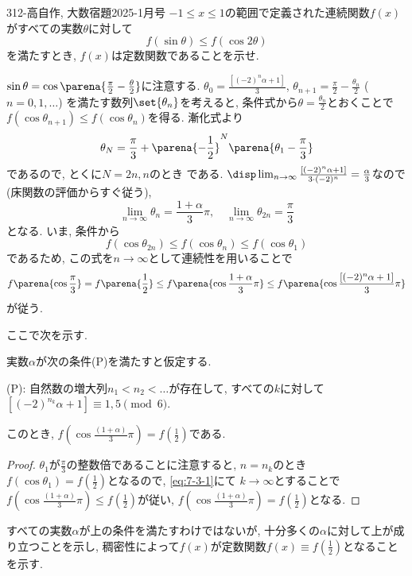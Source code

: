 \begin{prob}{312}{-高}{自作, 大数宿題2025-1月号}
$-1\leq x\leq 1$の範囲で定義された連続関数$f(x)$がすべての実数$\theta$に対して
\[ f(\sin{\theta}) \leq f(\cos{2\theta}) \]
を満たすとき, $f(x)$は定数関数であることを示せ. 
\end{prob}


 $\sin{\theta} = \cos{\parena{\frac{\pi}{2} - \frac{\theta}{2}}}$に注意する. $\theta_{0}=\frac{[(-2)^n \alpha +1]}{3}$, 
 $\theta_{n+1}=\frac{\pi}{2} - \frac{\theta_{n}}{2}$ ($n=0,1,\dots$) を満たす数列$\set{\theta_{n}}$を考えると, 条件式から$\theta = \frac{\theta_n}{2}$とおくことで $f(\cos{\theta_{n+1}})\leq f(\cos{\theta_{n}})$を得る. 
漸化式より
 \[\theta_{N} = \frac{\pi}{3} + \parena{-\frac{1}{2}}^{N}\parena{\theta_1 - \frac{\pi}{3}}\]
 であるので, とくに$N=2n,n$のとき
である. $\disp\lim_{n\to \infty} \frac{[(-2)^n\alpha + 1]}{3\cdot (-2)^n} = \frac{\alpha}{3}$なので(床関数の評価からすぐ従う), 
\[
\lim_{n\to \infty} \theta_n = \frac{1+\alpha}{3}\pi ,\quad \lim_{n\to\infty} \theta_{2n} = \frac{\pi}{3}
\]
となる. いま, 条件から
\begin{equation} \label{eq:7-3-1}
f(\cos{\theta_{2n}}) \leq f(\cos{\theta_n}) \leq f(\cos{\theta_1})
\end{equation}
であるため, この式を$n\to \infty$として連続性を用いることで
\[
f\parena{\cos{\frac{\pi}{3}}} = f\parena{\frac{1}{2}} \leq f\parena{\cos{\frac{1+\alpha}{3}\pi }} \leq f\parena{\cos{\frac{[(-2)^n\alpha + 1]}{3}\pi}}
\]
が従う. 


ここで次を示す. 
\begin{lem}\label{on_(P)_constant}
実数$\alpha$が次の条件(P)を満たすと仮定する. 
\begin{center}
(P): 自然数の増大列$n_1 < n_2 < \dots$が存在して, すべての$k$に対して $[(-2)^{n_k}\alpha + 1]\equiv 1,5\pmod{6}$.
\end{center}
このとき, $f(\cos{\frac{(1+\alpha)}{3}\pi}) = f(\frac{1}{2})$である. 
\end{lem}
\begin{proof}
$\theta_1$が$\frac{\pi}{3}$の整数倍であることに注意すると, $n=n_k$のとき $f(\cos{\theta_1}) = f(\frac{1}{2})$となるので, \cref{eq:7-3-1}にて $k\to \infty$とすることで$f(\cos{\frac{(1+\alpha)}{3}\pi}) \leq f(\frac{1}{2})$が従い, $f(\cos{\frac{(1+\alpha)}{3}\pi}) = f(\frac{1}{2})$となる.     
\end{proof}
すべての実数$\alpha$が上の条件を満たすわけではないが, 十分多くの$\alpha$に対して上が成り立つことを示し, 稠密性によって$f(x)$が定数関数$f(x) \equiv f(\frac{1}{2})$となることを示す. 

